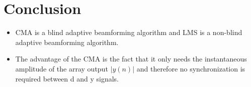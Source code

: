 \pagestyle{fancy}
\fancyhf{}
\rfoot{\thepage}
\chapter{Conclusion}

\begin{itemize}
\item CMA is a blind adaptive beamforming algorithm and LMS is a non-blind adaptive beamforming algorithm. 
\item The advantage of the CMA is the fact that it only needs the instantaneous amplitude of the array output $|y(n)|$ and therefore
no synchronization is required between d and y signals.
\end{itemize}
